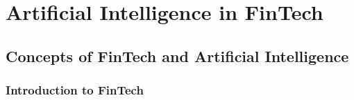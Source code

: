 \chapter{Artificial Intelligence in FinTech}

\section{Concepts of FinTech and Artificial Intelligence}

\subsection{Introduction to FinTech}

